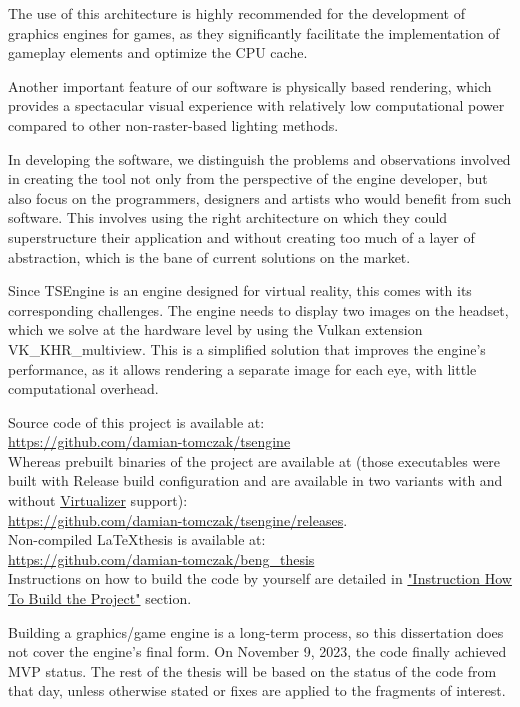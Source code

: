 The use of this architecture is highly recommended for the development of graphics engines for games, as they significantly facilitate the implementation of gameplay elements and optimize the CPU cache.

Another important feature of our software is physically based rendering, which provides a spectacular visual experience with relatively low computational power compared to other non-raster-based lighting methods.

In developing the software, we distinguish the problems and observations involved in creating the tool not only from the perspective of the engine developer, but also focus on the programmers, designers and artists who would benefit from such software. This involves using the right architecture on which they could superstructure their application and without creating too much of a layer of abstraction, which is the bane of current solutions on the market.

Since TSEngine is an engine designed for virtual reality, this comes with its corresponding challenges. The engine needs to display two images on the headset, which we solve at the hardware level by using the Vulkan extension VK\_KHR\_multiview. This is a simplified solution that improves the engine's performance, as it allows rendering a separate image for each eye, with little computational overhead.

Source code of this project is available at:\\
\href{https://github.com/damian-tomczak/tsengine}{https://github.com/damian-tomczak/tsengine}\\
Whereas prebuilt binaries of the project are available at (those executables were built with Release build configuration and are available in two variants with and without \hyperref[sec:hardware]{Virtualizer} support):\\
\href{https://github.com/damian-tomczak/tsengine/releases}{https://github.com/damian-tomczak/tsengine/releases}.\\
Non-compiled \LaTeX thesis is available at:\\
\href{https://github.com/damian-tomczak/beng_thesis}{https://github.com/damian-tomczak/beng\_thesis}\\
Instructions on how to build the code by yourself are detailed in \hyperref[sec:how_to_run]{"Instruction How To Build the Project"} section.

Building a graphics/game engine is a long-term process, so this dissertation does not cover the engine's final form.
On November 9, 2023, the code finally achieved MVP status. The rest of the thesis will be based on the status of the code from that day, unless otherwise stated or fixes are applied to the fragments of interest.

